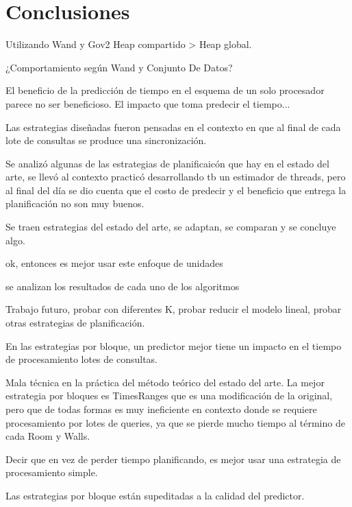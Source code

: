 \chapter{Conclusiones}
\label{cap:conclu}

Utilizando Wand y Gov2 Heap compartido > Heap global.

¿Comportamiento según Wand y Conjunto De Datos? 

El beneficio de la predicción de tiempo en el esquema de un solo procesador parece no ser beneficioso. 
El impacto que toma predecir el tiempo...

Las estrategias diseñadas fueron pensadas en el contexto en que al final de cada lote de consultas se produce una sincronización.

Se analizó algunas de las estrategias de planificaicón que hay en el estado del arte, se llevó al contexto practicó desarrollando tb un estimador de threads, pero al final del día se dio cuenta que el costo de predecir y el beneficio que entrega la planificación no son muy buenos.

Se traen estrategias del estado del arte, se adaptan, se comparan y se concluye algo.

ok, entonces es mejor usar este enfoque de unidades

se analizan los resultados de cada uno de los algoritmos

Trabajo futuro, probar con diferentes K, probar reducir el modelo lineal, probar otras estrategias de planificación.

En las estrategias por bloque, un predictor mejor tiene un impacto en el tiempo de procesamiento lotes de consultas.

Mala técnica en la práctica del método teórico del estado del arte. La mejor estrategia por bloques es TimesRanges que es una modificación de la original, pero que de todas formas es muy ineficiente en contexto donde se requiere procesamiento por lotes de queries, ya que se pierde mucho tiempo al término de cada Room y Walls. 

Decir que en vez de perder tiempo planificando, es mejor usar una estrategia de procesamiento simple. 

Las estrategias por bloque están supeditadas a la calidad del predictor.